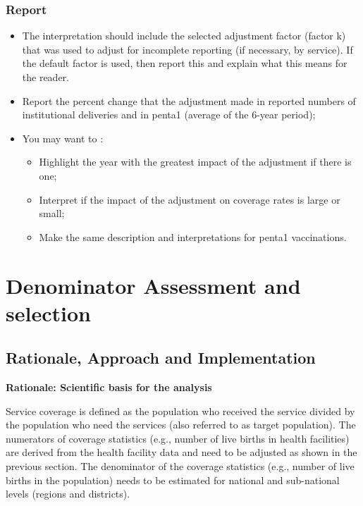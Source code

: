 \documentclass[
  english,
  letterpaper,
  DIV=11,
  numbers=noendperiod]{scrreprt}
\providecommand{\tightlist}{%
  \setlength{\itemsep}{0pt}\setlength{\parskip}{0pt}}
\begin{document}
\subsection{\texorpdfstring{\textbf{Report}}{Report}}\label{sec-dqa-adjust-report}

\begin{itemize}
\tightlist
\item
  The interpretation should include the selected adjustment factor
  (factor k) that was used to adjust for incomplete reporting (if
  necessary, by service). If the default factor is used, then report
  this and explain what this means for the reader.
\item
  Report the percent change that the adjustment made in reported numbers
  of institutional deliveries and in penta1 (average of the 6-year
  period);
\item
  You may want to :

  \begin{itemize}
  \tightlist
  \item
    Highlight the year with the greatest impact of the adjustment if
    there is one;
  \item
    Interpret if the impact of the adjustment on coverage rates is large
    or small;
  \item
    Make the same description and interpretations for penta1
    vaccinations.
  \end{itemize}
\end{itemize}

\chapter{Denominator Assessment and
selection}\label{sec-denom-assessment}

\section{Rationale, Approach and
Implementation}\label{rationale-approach-and-implementation}

\textbf{Rationale: Scientific basis for the analysis}

Service coverage is defined as the population who received the service
divided by the population who need the services (also referred to as
target population). The numerators of coverage statistics (e.g., number
of live births in health facilities) are derived from the health
facility data and need to be adjusted as shown in the previous section.
The denominator of the coverage statistics (e.g., number of live births
in the population) needs to be estimated for national and sub-national
levels (regions and districts).
\end{document}
